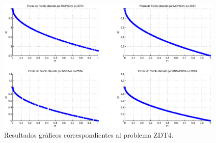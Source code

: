  \DIFaddend \clearpage
 \newpage
 \begin{figure}
      \begin{center}
	  \includegraphics[scale=0.45]{Cap4/rzdt4r.eps}
      \end{center}
	\caption{Resultados gr\'aficos correspondientes al problema ZDT4.}
      \label{fig:rZDT4}
      \end{figure}
 \clearpage
 \newpage

